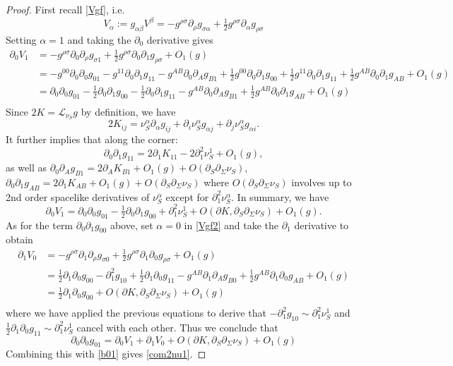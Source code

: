 \documentclass[10pt]{amsart}
\renewcommand{\a}{\alpha}
\renewcommand{\b}{\beta}
\newcommand{\s}{\sigma}
\newcommand{\Si}{\Sigma}
\newcommand{\cL}{{\mathcal L}}
\newcommand{\be}{\begin{equation}}
\newcommand{\ee}{\end{equation}}
\newcommand{\bes}{\begin{equation*}}
\newcommand{\ees}{\end{equation*}}
\newcommand{\p}{\partial}
\newcommand{\<}{\langle}
\renewcommand{\>}{\rangle}
\theoremstyle{plain}
\theoremstyle{remark}
\theoremstyle{definition}
\numberwithin{equation}{section}
\begin{document}
\begin{proof}
First recall \eqref{Vgf}, i.e.   
\be\label{Vgf2}
V_\a:=g_{\a\b}V^\b=-g^{\rho\s}\p_\rho g_{\s\a}+\tfrac{1}{2}g^{\rho\s}\p_\a g_{\rho\s}
\ee
Setting $\a=1$ and taking the $\p_0$ derivative gives  
\bes
\begin{split}
\p_0V_1&=-g^{\rho\s}\p_0\p_\rho g_{\s1}+\tfrac{1}{2}g^{\rho\s}\p_0\p_1 g_{\rho\s}+O_1(g)\\
&=-g^{00}\p_0\p_0 g_{01}-g^{11}\p_0\p_1 g_{11}-g^{AB}\p_0\p_A g_{B1}+\tfrac{1}{2}g^{00}\p_0\p_1 g_{00}+\tfrac{1}{2}g^{11}\p_0\p_1 g_{11}+\tfrac{1}{2}g^{AB}\p_0\p_1 g_{AB}+O_1(g)\\
&=\p_0\p_0 g_{01}-\tfrac{1}{2}\p_0\p_1 g_{00}-\tfrac{1}{2}\p_0\p_1 g_{11}-g^{AB}\p_0\p_A g_{B1}+\tfrac{1}{2}g^{AB}\p_0\p_1 g_{AB}+O_1(g)\\
\end{split}
\ees
Since $2K=\cL_{\nu_S}g$ by definition, we have 
\bes
2K_{ij}=\nu_S^\a\p_\a g_{ij}+\p_i \nu_S^\a g_{\a j}+\p_j \nu_S^\a g_{\a i}.
\ees
It further implies that along the corner:
\bes
\p_0\p_1 g_{11}=2\p_1 K_{11}-2\p_1^2\nu_S^1+O_1(g), 
\ees
as well as $\p_0\p_A g_{B1}=2\p_A K_{B1}+O_1(g)+O(\p_S\p_\Si \nu_S)$, $\p_0\p_1 g_{AB}=2\p_1 K_{AB}+O_1(g)+O(\p_S\p_\Si \nu_S)$ 
where $O(\p_S\p_\Si \nu_S)$ involves up to 2nd order spacelike derivatives of $\nu_S^\a$ except for $\p_1^2 \nu_S^\a$.
In summary, we have 
\bes
\p_0 V_1=\p_0\p_0 g_{01}-\tfrac{1}{2}\p_0\p_1 g_{00}+\p_1^2\nu_S^1+O(\p K,\p_S\p_\Si \nu_S)+O_1(g). 
\ees
As for the term $\p_0\p_1 g_{00}$ above, set $\a=0$ in \eqref{Vgf2} and take the $\p_1$ derivative to obtain 
\bes
\begin{split}
\p_1V_0&=-g^{\rho\s}\p_1\p_\rho g_{\s0}+\tfrac{1}{2}g^{\rho\s}\p_1\p_0 g_{\rho\s}+O_1(g)\\
&=\tfrac{1}{2}\p_1\p_0 g_{00}-\p^2_1 g_{10}+\tfrac{1}{2}\p_1\p_0 g_{11}-g^{AB}\p_1\p_A g_{B0}+\tfrac{1}{2}g^{AB}\p_1\p_0 g_{AB}+O_1(g)\\
&=\tfrac{1}{2}\p_1\p_0 g_{00}+O(\p K,\p_S\p_\Si \nu_S)+O_1(g)\\
\end{split}
\ees
where we have applied the previous equations to derive that $-\p^2_1 g_{10}\sim \p_1^2\nu_S^1$ and $\tfrac{1}{2}\p_1\p_0 g_{11}\sim \p_1^2\nu_S^1$ cancel with each other.
Thus we conclude that
\bes
\p_0\p_0 g_{01}=\p_0 V_1+\p_1 V_0+O(\p K,\p_S\p_\Si \nu_S)+O_1(g)
\ees
Combining this with \eqref{b01} gives \eqref{com2nu1}. 

\end{proof}
  
\end{document}
